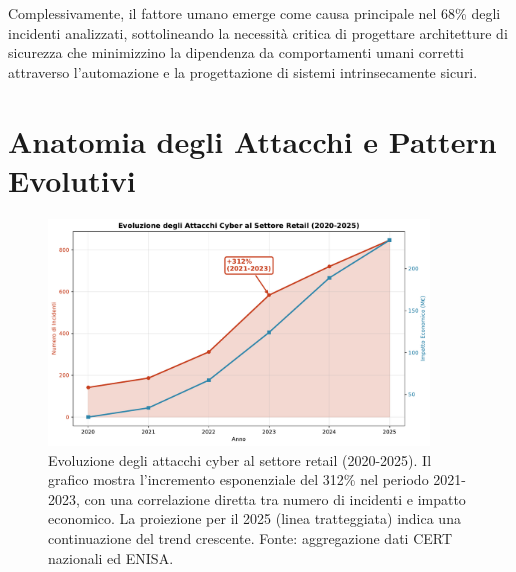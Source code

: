 Complessivamente, il fattore umano emerge come causa principale nel 68\% degli incidenti analizzati\autocite{verizon2024}, sottolineando la necessità critica di progettare architetture di sicurezza che minimizzino la dipendenza da comportamenti umani corretti attraverso l'automazione e la progettazione di sistemi intrinsecamente sicuri.

\section{\texorpdfstring{\textbf{Anatomia degli Attacchi e Pattern Evolutivi}}{2.3 - Anatomia degli Attacchi e Pattern Evolutivi}}

\begin{figure}[H]
\centering
\includegraphics[width=0.9\textwidth]{thesis_figures/cap2/fig_2_1_cyber_evolution.pdf}
\caption{Evoluzione degli attacchi cyber al settore retail (2020-2025). Il grafico mostra l'incremento esponenziale del 312\% nel periodo 2021-2023, con una correlazione diretta tra numero di incidenti e impatto economico. La proiezione per il 2025 (linea tratteggiata) indica una continuazione del trend crescente. Fonte: aggregazione dati CERT nazionali ed ENISA.}
\label{fig:cyber_evolution}
\end{figure}



